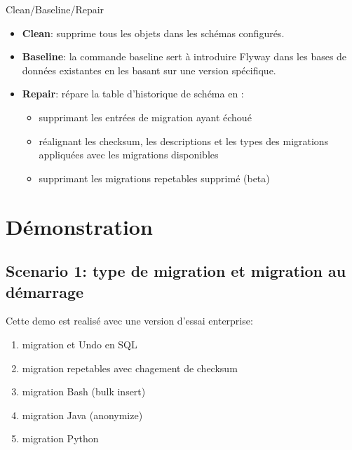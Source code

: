 \documentclass[slidestop,compress,11pt,xcolor=dvipsnames,french]{beamer}
\begin{document}
\begin{frame}{Clean/Baseline/Repair}
\vspace{1cm}
\begin{itemize}
 \item \textbf{Clean}: supprime tous les objets dans les schémas configurés.
 \item \textbf{Baseline}: la commande baseline sert à introduire Flyway dans les bases de données existantes en les basant sur une version spécifique.
 \item \textbf{Repair}: répare la table d'historique de schéma en :
    \begin{itemize}
        \item supprimant les entrées de migration ayant échoué
        \item réalignant les checksum, les descriptions et les types des migrations appliquées avec les migrations disponibles
        \item supprimant les migrations repetables supprimé (beta)
    \end{itemize}
\end{itemize}
\end{frame}

\section[Démo]{Démonstration}
\subsection*{Scenario 1: type de migration et migration au démarrage}
\begin{frame}
Cette demo est realisé avec une version d'essai enterprise: 
\begin{enumerate}
 \item migration et Undo en SQL 
 \item migration repetables avec chagement de checksum
 \item migration Bash (bulk insert)
 \item migration Java (anonymize)
 \item migration Python 
\end{enumerate}
\end{frame}
\end{document}
